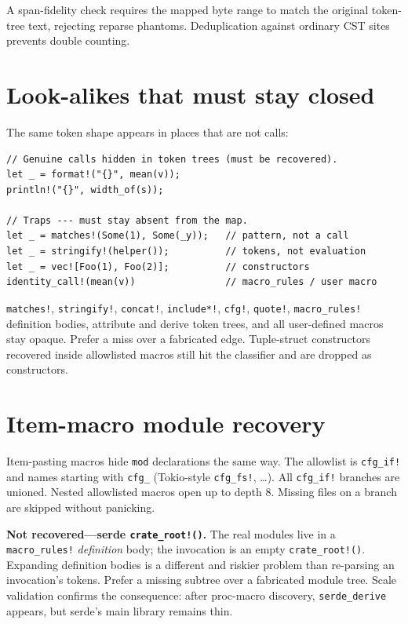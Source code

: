\documentclass[11pt,a4paper,oneside]{report}
\begin{document}
A span-fidelity check requires the mapped byte range to match the original
token-tree text, rejecting reparse phantoms. Deduplication against ordinary
CST sites prevents double counting.

\section{Look-alikes that must stay closed}

The same token shape appears in places that are not calls:

\begin{lstlisting}
// Genuine calls hidden in token trees (must be recovered).
let _ = format!("{}", mean(v));
println!("{}", width_of(s));

// Traps --- must stay absent from the map.
let _ = matches!(Some(1), Some(_y));   // pattern, not a call
let _ = stringify!(helper());          // tokens, not evaluation
let _ = vec![Foo(1), Foo(2)];          // constructors
identity_call!(mean(v))                // macro_rules / user macro
\end{lstlisting}

\texttt{matches!}, \texttt{stringify!}, \texttt{concat!}, \texttt{include*!},
\texttt{cfg!}, \texttt{quote!}, \texttt{macro\_rules!} definition bodies,
attribute and derive token trees, and all user-defined macros stay opaque.
Prefer a miss over a fabricated edge. Tuple-struct constructors recovered
inside allowlisted macros still hit the classifier and are dropped as
constructors.

\section{Item-macro module recovery}

Item-pasting macros hide \texttt{mod} declarations the same way. The
allowlist is \texttt{cfg\_if!} and names starting with \texttt{cfg\_}
(Tokio-style \texttt{cfg\_fs!}, \ldots). All \texttt{cfg\_if!} branches are
unioned. Nested allowlisted macros open up to depth 8. Missing files on a
branch are skipped without panicking.

\textbf{Not recovered---serde \texttt{crate\_root!()}.} The real modules live
in a \texttt{macro\_rules!} \emph{definition} body; the invocation is an empty
\texttt{crate\_root!()}. Expanding definition bodies is a different and
riskier problem than re-parsing an invocation's tokens. Prefer a missing
subtree over a fabricated module tree. Scale validation confirms the
consequence: after proc-macro discovery, \texttt{serde\_derive} appears, but
serde's main library remains thin.
\end{document}
